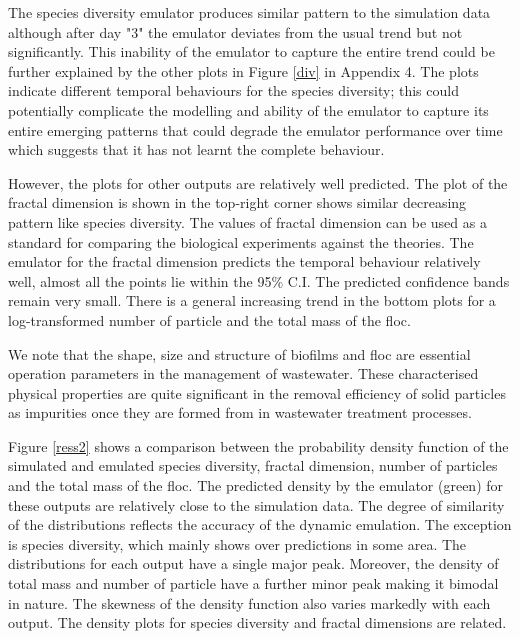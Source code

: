 The species diversity emulator produces similar pattern to the simulation data although after day "3" the emulator deviates from the usual trend but not significantly. This inability of the emulator to capture the entire trend could be further explained by the other plots in Figure \ref{div} in Appendix 4. The plots indicate different temporal behaviours for the species diversity; this could potentially complicate the modelling and ability of the emulator to capture its entire emerging patterns that could degrade the emulator performance over time which suggests that it has not learnt the complete behaviour. 

However, the plots for other outputs are relatively well predicted. The plot of the fractal dimension is shown in the top-right corner shows similar decreasing pattern like species diversity. The values of fractal dimension can be used as a standard for comparing the biological experiments against the theories. The emulator for the fractal dimension predicts the temporal behaviour relatively well, almost all the points lie within the 95\% C.I. The predicted confidence bands remain very small. There is a general increasing trend in the bottom plots for a log-transformed number of particle and the total mass of the floc. 

We note that the shape, size and structure of biofilms and floc are essential operation parameters in the management of wastewater. These characterised physical properties are quite significant in the removal efficiency of solid particles as impurities once they are formed from in wastewater treatment processes.

Figure \ref{ress2} shows a comparison between the probability density function of the simulated and emulated species diversity, fractal dimension, number of particles and the total mass of the floc. The predicted density by the emulator (green) for these outputs are relatively close to the simulation data. The degree of similarity of the distributions reflects the accuracy of the dynamic emulation. The exception is species diversity, which mainly shows over predictions in some area.
The distributions for each output have a single major peak. Moreover, the density of total mass and number of particle have a further minor peak making it bimodal in nature. The skewness of the density function also varies markedly with each output. The density plots for species diversity and fractal dimensions are related. 

